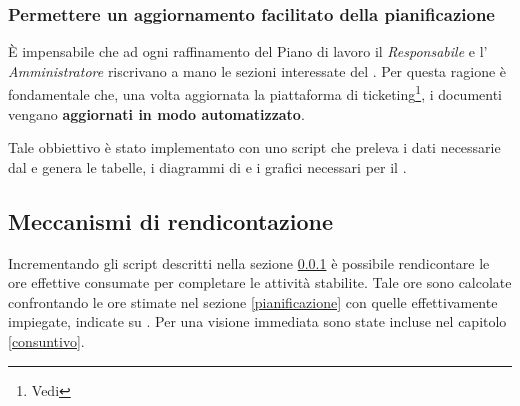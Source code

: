 \subsubsection{Permettere un aggiornamento facilitato della pianificazione}
\label{script}
È impensabile che ad ogni raffinamento del Piano di lavoro il \emph{Responsabile} e l' \emph{Amministratore} riscrivano a mano le sezioni interessate del \PianoDiProgetto.
Per questa ragione è fondamentale che, una volta aggiornata la piattaforma di ticketing\footnote{Vedi \NormeDiProgetto}, i documenti vengano \textbf{aggiornati in modo automatizzato}.

Tale obbiettivo è stato implementato con uno script che preleva i dati necessarie dal  e genera le tabelle, i diagrammi di  e i grafici necessari per il \PianoDiProgetto.

\subsection{Meccanismi di rendicontazione}

Incrementando gli script descritti nella sezione \ref{script} è possibile rendicontare le ore effettive consumate per completare le attività stabilite.
Tale ore sono calcolate confrontando le ore stimate nel \PianoDiProgetto sezione \ref{pianificazione} con quelle effettivamente impiegate, indicate su .
Per una visione immediata sono state incluse nel capitolo \ref{consuntivo}.


